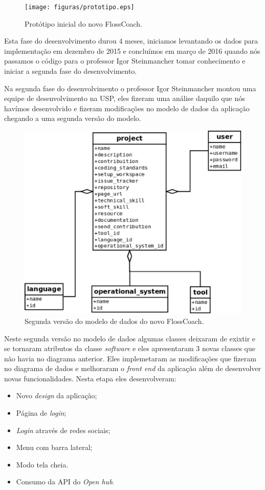\begin{figure}[h]
	\centering
	\label{fig:prototipo}
		\texttt{[image: figuras/prototipo.eps]}
	\caption{Protótipo inicial do novo FlossCoach.}
\end{figure}

Esta fase do desenvolvimento durou 4 meses, iniciamos levantando os dados para implementação
em dezembro de 2015 e concluímos em março de 2016 quando nós passamos o código para o
professor Igor Steinmancher tomar conhecimento e iniciar a segunda fase do desenvolvimento.  


Na segunda fase do desenvolvimento o professor Igor Steinmancher montou uma equipe 
de desenvolvimento na USP, eles fizeram uma análise daquilo que nós havímos desenvolvido
e fizeram modificações no modelo de dados da aplicação chegando a uma segunda versão do 
modelo.

\begin{figure}[h]
	\centering
	\label{fig:diagrama_fase2}
		\includegraphics[keepaspectratio=true,scale=0.3]{figuras/diagrama_fase2.eps}
	\caption{Segunda versão do modelo de dados do novo FlossCoach.}
\end{figure}

Neste segunda versão no modelo de dados algumas classes deixaram de exixtir e se tornaram
atributos da classe \textit{software} e eles apresentaram 3 novas classes que não havia
no diagrama anterior. Eles implemetaram as modificações que fizeram no diagrama de dados
e melhoraram o \textit{front end} da aplicação além de desenvolver novas funcionalidades. 
Nesta etapa eles desenvolveram:
\begin{itemize}
\item Novo \textit{design} da aplicação;
\item Página de \textit{login}; 
\item \textit{Login} através de redes sociais;
\item Menu com barra lateral;
\item Modo tela cheia.
\item Consumo da API do \textit{Open hub}.
\end{itemize}

